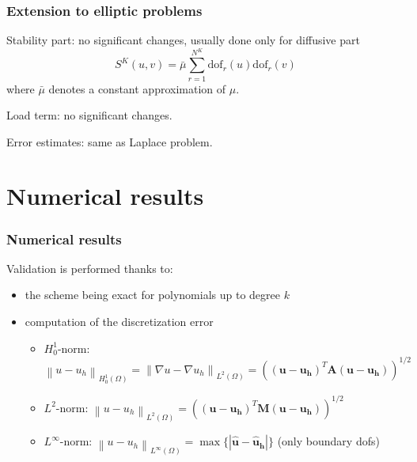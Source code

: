 \documentclass[10pt]{beamer}
\newcommand{\norm}[2]{\left\lVert#1\right\rVert_{#2}}
\newcommand{\dof}{\text{dof}}
\newcommand{\mymatrix}[1]{\mathbf{#1}}
\begin{document}
\begin{frame} \frametitle{Extension to elliptic problems}
Stability part: no significant changes, usually done only for diffusive part
\begin{equation*}
S^K(u,v)=\bar{\mu} \sum_{r=1}^{N^K} \dof_r(u) \dof_r(v)
\label{eqn:Sk_weighted_def}
\end{equation*}
where $\bar{\mu}$ denotes a constant approximation of $\mu$. 
\vspace{0.5cm}

Load term: no significant changes.

Error estimates: same as Laplace problem.
\end{frame}
	
	
	\section{Numerical results} 
	\begin{frame}\frametitle{Numerical results}
Validation is performed thanks to:
	\begin{itemize}
	\item the scheme being exact for polynomials up to degree $k$
	\item computation of the discretization error
	\begin{itemize}
		\item $H^1_0$-norm: $\norm{u-u_h}{H_0^1(\Omega)}=\norm{\nabla u-\nabla u_h}{L^2(\Omega)}=\left( (\mathbf{u}-\mathbf{u_h})^T \mymatrix{A} (\mathbf{u}-\mathbf{u_h}) \right)^{1/2}$
		\item $L^2$-norm: $\norm{u-u_h}{L^2(\Omega)}=\left( (\mathbf{u}-\mathbf{u_h})^T \mymatrix{M} (\mathbf{u}-\mathbf{u_h}) \right)^{1/2}$
		\item $L^\infty$-norm: $\norm{u-u_h}{L^\infty(\Omega)}=\max \lbrace | \hat{\mathbf{u}}-\hat{\mathbf{u}}_\mathbf{h} |\rbrace$ (only boundary dofs)
	\end{itemize}
\end{itemize}
\end{frame}
\end{document}
